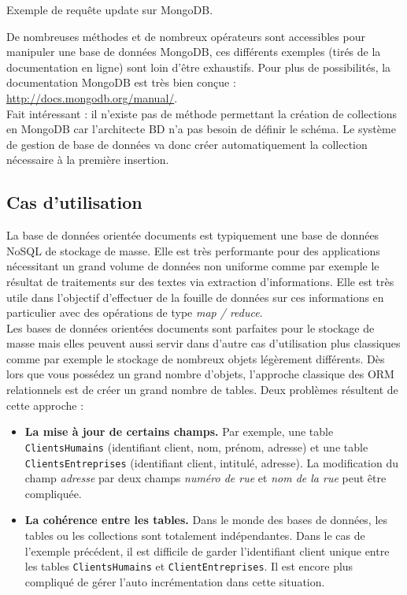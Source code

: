 	\begin{listing}[H]
		\inputminted{javascript}{code/requeteMongoUpdate.js}
		\caption{Exemple de requête update sur MongoDB.}
		\label{updateMongoDB}
	\end{listing}

	De nombreuses méthodes et de nombreux opérateurs sont accessibles pour manipuler une base de données MongoDB, ces différents exemples (tirés de la documentation en ligne) sont loin d'être exhaustifs. Pour plus de possibilités, la documentation MongoDB est très bien conçue : \url{http://docs.mongodb.org/manual/}.\\

	Fait intéressant : il n'existe pas de méthode permettant la création de collections en MongoDB car l'architecte BD n'a pas besoin de définir le schéma. Le système de gestion de base de données va donc créer automatiquement la collection nécessaire à la première insertion.

\subsection{Cas d'utilisation}

	La base de données orientée documents est typiquement une base de données NoSQL de stockage de masse. Elle est très performante pour des applications nécessitant un grand volume de données non uniforme comme par exemple le résultat de traitements sur des textes via extraction d'informations. Elle est très utile dans l'objectif d'effectuer de la fouille de données sur ces informations en particulier avec des opérations de type \textit{map / reduce}.\\

	Les bases de données orientées documents sont parfaites pour le stockage de masse mais elles peuvent aussi servir dans d'autre cas d'utilisation plus classiques comme par exemple le stockage de nombreux objets légèrement différents. Dès lors que vous possédez un grand nombre d'objets, l'approche classique des ORM relationnels est de créer un grand nombre de tables. Deux problèmes résultent de cette approche : \\
	\begin{itemize}
		\item \textbf{La mise à jour de certains champs.} Par exemple, une table \texttt{ClientsHumains} (identifiant client, nom, prénom, adresse) et une table \texttt{ClientsEntreprises} (identifiant client, intitulé, adresse). La modification du champ \textit{adresse} par deux champs \textit{numéro de rue} et \textit{nom de la rue} peut être compliquée.
		\item \textbf{La cohérence entre les tables.} Dans le monde des bases de données, les tables ou les collections sont totalement indépendantes. Dans le cas de l'exemple précédent, il est difficile de garder l'identifiant client unique entre les tables \texttt{ClientsHumains} et \texttt{ClientEntreprises}. Il est encore plus compliqué de gérer l'auto incrémentation dans cette situation.
	\end{itemize}

